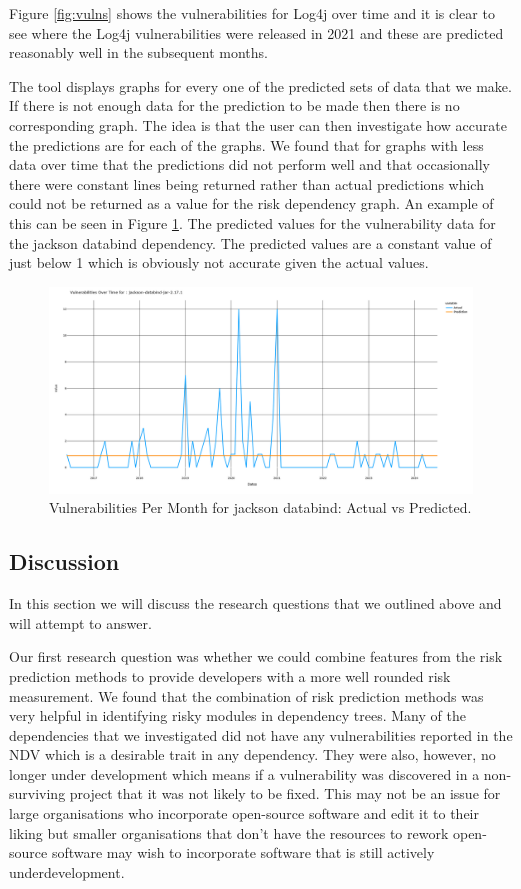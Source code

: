 \documentclass[conference]{IEEEtran}
\begin{document}
Figure \ref{fig:vulns} shows the vulnerabilities for Log4j over time and it is clear to see where the Log4j vulnerabilities were released in 2021 and these are predicted reasonably well in the subsequent months. 

The tool displays graphs for every one of the predicted sets of data that we make. If there is not enough data for the prediction to be made then there is no corresponding graph. The idea is that the user can then investigate how accurate the predictions are for each of the graphs. We found that for graphs with less data over time that the predictions did not perform well and that occasionally there were constant lines being returned rather than actual predictions which could not be returned as a value for the risk dependency graph. An example of this can be seen in Figure \ref{fig:const}. The predicted values for the vulnerability data for the jackson databind dependency. The predicted values are a constant value of just below 1 which is obviously not accurate given the actual values. 

\begin{figure}[H]
    \centering
    \includegraphics[width=1\linewidth]{Const.png}
    \caption{Vulnerabilities Per Month for jackson databind: Actual vs Predicted.} 
    \label{fig:const}
\end{figure}

\subsection{Discussion}
In this section we will discuss the research questions that we outlined above and will attempt to answer. 

Our first research question was whether we could combine features from the risk prediction methods to provide developers with a more well rounded risk measurement. We found that the combination of risk prediction methods was very helpful in identifying risky modules in dependency trees. Many of the dependencies that we investigated did not have any vulnerabilities reported in the NDV which is a desirable trait in any dependency. They were also, however, no longer under development which means if a vulnerability was discovered in a non-surviving project that it was not likely to be fixed. This may not be an issue for large organisations who incorporate open-source software and edit it to their liking but smaller organisations that don't have the resources to rework open-source software may wish to incorporate software that is still actively underdevelopment.
\end{document}
